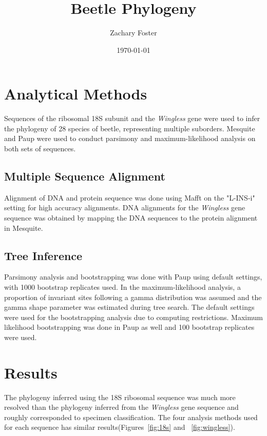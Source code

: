 \documentclass{article}\usepackage[]{graphicx}\usepackage[]{color}
\title{Beetle Phylogeny}
\author{Zachary Foster}
\date{\today}
\begin{document}
\maketitle



\section{Analytical Methods}
Sequences of the ribosomal 18S subunit and the \textit{Wingless} gene were used to infer the phylogeny of 28 species of beetle, representing multiple suborders. Mesquite \cite{maddison_mesquite:_2001} and Paup \cite{swofford_paup*._2003} were used to conduct parsimony and maximum-likelihood analysis on both sets of sequences.

\subsection*{Multiple Sequence Alignment}
Alignment of DNA and protein sequence was done using Mafft on the "L-INS-i" setting for high accuracy alignments. 
DNA alignments for the \textit{Wingless} gene sequence was obtained by mapping the DNA sequences to the protein alignment in Mesquite. 

\subsection*{Tree Inference}
Parsimony analysis and bootstrapping was done with Paup using default settings, with 1000 bootstrap replicates used. 
In the maximum-likelihood analysis, a proportion of invariant sites following a gamma distribution was assumed and the gamma shape parameter was estimated during tree search. 
The default settings were used for the bootstrapping analysis due to computing restrictions.
Maximum likelihood bootstrapping was done in Paup as well and 100 bootstrap replicates were used. 



\section{Results}
The phylogeny inferred using the 18S ribosomal sequence was much more resolved than the phylogeny inferred from the \textit{Wingless} gene sequence and roughly corresponded to specimen classification. 
The four analysis methods used for each sequence has similar results(Figures~\ref{fig:18s} and ~\ref{fig:wingless}). 
\end{document}
